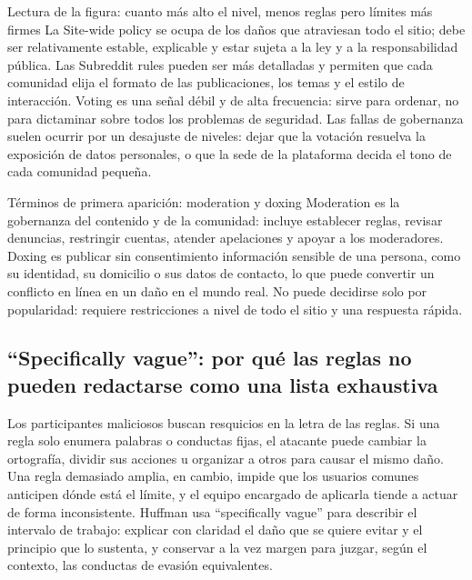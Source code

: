 \begin{knowledgebox}{Lectura de la figura: cuanto más alto el nivel, menos reglas pero límites más firmes}
La Site-wide policy se ocupa de los daños que atraviesan todo el sitio; debe ser relativamente estable, explicable y estar sujeta a la ley y a la responsabilidad pública. Las Subreddit rules pueden ser más detalladas y permiten que cada comunidad elija el formato de las publicaciones, los temas y el estilo de interacción. Voting es una señal débil y de alta frecuencia: sirve para ordenar, no para dictaminar sobre todos los problemas de seguridad. Las fallas de gobernanza suelen ocurrir por un desajuste de niveles: dejar que la votación resuelva la exposición de datos personales, o que la sede de la plataforma decida el tono de cada comunidad pequeña.
\end{knowledgebox}

\begin{importantbox}{Términos de primera aparición: moderation y doxing}
Moderation es la gobernanza del contenido y de la comunidad: incluye establecer reglas, revisar denuncias, restringir cuentas, atender apelaciones y apoyar a los moderadores. Doxing es publicar sin consentimiento información sensible de una persona, como su identidad, su domicilio o sus datos de contacto, lo que puede convertir un conflicto en línea en un daño en el mundo real. No puede decidirse solo por popularidad: requiere restricciones a nivel de todo el sitio y una respuesta rápida.
\end{importantbox}

\subsection{``Specifically vague'': por qué las reglas no pueden redactarse como una lista exhaustiva}

Los participantes maliciosos buscan resquicios en la letra de las reglas. Si una regla solo enumera palabras o conductas fijas, el atacante puede cambiar la ortografía, dividir sus acciones u organizar a otros para causar el mismo daño. Una regla demasiado amplia, en cambio, impide que los usuarios comunes anticipen dónde está el límite, y el equipo encargado de aplicarla tiende a actuar de forma inconsistente. Huffman usa ``specifically vague'' para describir el intervalo de trabajo: explicar con claridad el daño que se quiere evitar y el principio que lo sustenta, y conservar a la vez margen para juzgar, según el contexto, las conductas de evasión equivalentes.

